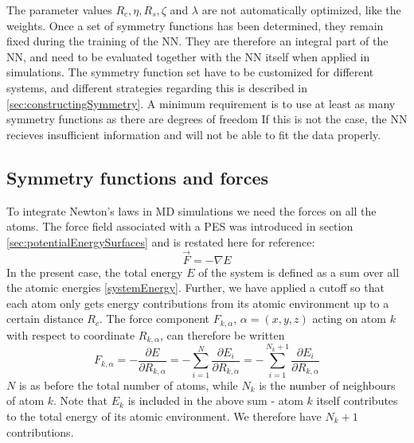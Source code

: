 \documentclass[twoside,english]{uiofysmaster}
\begin{document}
The parameter values $R_c, \eta, R_s, \zeta$ and $\lambda$ are not automatically optimized, like the weights. 
Once a set of symmetry functions has been determined, they remain fixed during the training of the NN. They are therefore
an integral part of the NN, and need to be evaluated together with the NN itself when applied in simulations. 
The symmetry function set have to be customized for different systems, and different strategies regarding this
is described in \autoref{sec:constructingSymmetry}. A minimum requirement is
to use at least as many symmetry functions as there are degrees of freedom
If this is not the case, the NN recieves insufficient information and will not be able to fit the data properly. 


\subsection{Symmetry functions and forces} \label{sec:symmAndForces}
To integrate Newton's laws in MD simulations we need the forces on all the atoms. The force field associated with a PES
was introduced in section \ref{sec:potentialEnergySurfaces} and is restated here for reference:
\begin{equation}
 \vec{F} = -\nabla E
 \label{forcePES2}
\end{equation}
In the present case, the total energy $E$ of the system is defined as a sum over all the atomic energies \eqref{systemEnergy}. 
Further, we have applied a cutoff so that each atom only gets energy contributions from its atomic environment up 
to a certain distance $R_c$.
The force component $F_{k,\alpha}$, $\alpha = (x,y,z)$ acting on atom $k$ with respect to coordinate $R_{k,\alpha}$,
can therefore be written \cite{Behler11symmetry}
\begin{equation}
 F_{k,\alpha} = -\frac{\partial E}{\partial R_{k,\alpha}} = -\sum_{i=1}^N\frac{\partial E_i}{\partial R_{k,\alpha}}
 = -\sum_{i=1}^{N_k+1}\frac{\partial E_i}{\partial R_{k,\alpha}}
 \label{forceAtomk}
\end{equation}
$N$ is as before the total number of atoms, while $N_k$ is the number of neighbours of atom $k$. 
Note that $E_k$ is included in the above sum - atom $k$ itself contributes to the total energy of its atomic
environment. We therefore have $N_k+1$ contributions. 
\end{document}
